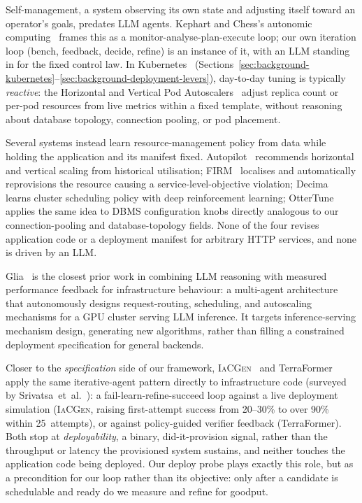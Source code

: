 Self-management, a system observing its own state and adjusting itself
toward an operator's goals, predates LLM agents.  Kephart and Chess's
autonomic computing~\cite{kephart2003autonomic} frames this as a
monitor-analyse-plan-execute loop; our own iteration loop (bench, feedback,
decide, refine) is an instance of it, with an LLM standing in for the fixed
control law.  In Kubernetes~\cite{burns2016borg,kubernetes}
(Sections~\ref{sec:background-kubernetes}--\ref{sec:background-deployment-levers}),
day-to-day tuning is typically \emph{reactive}: the Horizontal and Vertical
Pod Autoscalers~\cite{kubernetes-hpa} adjust replica count or per-pod
resources from live metrics within a fixed template, without reasoning
about database topology, connection pooling, or pod placement.

Several systems instead learn resource-management policy from data while
holding the application and its manifest fixed.
Autopilot~\cite{rzadca2020autopilot} recommends horizontal and vertical
scaling from historical utilisation; FIRM~\cite{qiu2020firm} localises and
automatically reprovisions the resource causing a service-level-objective
violation; Decima~\cite{mao2019decima} learns cluster scheduling policy with
deep reinforcement learning; OtterTune~\cite{vanaken2017ottertune} applies
the same idea to DBMS configuration knobs directly analogous to our
connection-pooling and database-topology fields.  None of the four revises
application code or a deployment manifest for arbitrary HTTP services, and
none is driven by an LLM.

Glia~\cite{hamadanian2025glia} is the closest prior work in combining LLM
reasoning with measured performance feedback for infrastructure behaviour: a
multi-agent architecture that autonomously designs request-routing,
scheduling, and autoscaling mechanisms for a GPU cluster serving LLM
inference.  It targets inference-serving mechanism design, generating new
algorithms, rather than filling a constrained deployment specification for
general backends.

Closer to the \emph{specification} side of our framework,
\textsc{IaCGen}~\cite{zhang2026iacgen} and TerraFormer~\cite{jana2026terraformer}
apply the same iterative-agent pattern directly to infrastructure code
(surveyed by Srivatsa~et~al.~\cite{srivatsa2024iacsurvey}): a
fail-learn-refine-succeed loop against a live deployment simulation
(\textsc{IaCGen}, raising first-attempt success from 20--30\% to over 90\%
within 25~attempts), or against policy-guided verifier feedback
(TerraFormer).  Both stop at \emph{deployability}, a binary, did-it-provision
signal, rather than the throughput or latency the provisioned system
sustains, and neither touches the application code being deployed.  Our
deploy probe plays exactly this role, but as a precondition for our loop
rather than its objective: only after a candidate is schedulable and ready
do we measure and refine for goodput.

